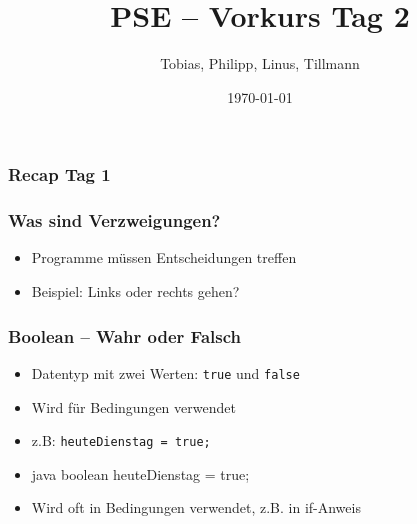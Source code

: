 \documentclass{../../presentation}
\title{PSE – Vorkurs Tag 2}
\author{Tobias, Philipp, Linus, Tillmann}
\institute{FIUS - Fachgruppe Informatik Universität Stuttgart}
\date{\today}
\begin{document}
\begin{frame}
  \titlepage
\end{frame}

\begin{frame}
  \listoftodos
\end{frame}

\begin{frame}
  \frametitle{Recap Tag 1}
\end{frame}

\begin{frame}
  \frametitle{Was sind Verzweigungen?}
  \begin{itemize}
    \item Programme müssen Entscheidungen treffen 
    \item Beispiel: Links oder rechts gehen?
  \end{itemize}
\end{frame}

\begin{frame}
  \frametitle{Boolean – Wahr oder Falsch}
  \begin{itemize}
    \item Datentyp mit zwei Werten: \texttt{true} und \texttt{false}
    \item Wird für Bedingungen verwendet

    \item z.B: \texttt{heuteDienstag = true;}
    \item \begin{code}{java}
boolean heuteDienstag = true;
    \end{code}
    \item<2-> Wird oft in Bedingungen verwendet, z.B. in if-Anweis
   
    
  \end{itemize}
\end{frame}
\end{document}
